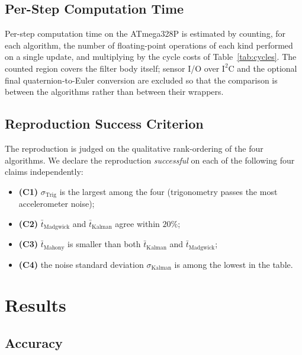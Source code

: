 \documentclass[conference]{IEEEtran}
\begin{document}
\subsection{Per-Step Computation Time}

Per-step computation time on the ATmega328P is estimated by
counting, for each algorithm, the number of floating-point
operations of each kind performed on a single update, and
multiplying by the cycle costs of Table~\ref{tab:cycles}. The
counted region covers the filter body itself; sensor I/O over
$\mathrm{I}^2\mathrm{C}$ and the optional final
quaternion-to-Euler conversion are excluded so that the comparison
is between the algorithms rather than between their wrappers.

\subsection{Reproduction Success Criterion}\label{sec:success}

The reproduction is judged on the qualitative rank-ordering of the
four algorithms. We declare the reproduction \emph{successful} on
each of the following four claims independently:
\begin{itemize}
\item \textbf{(C1)} $\sigma_{\mathrm{Trig}}$ is the largest among
the four (trigonometry passes the most accelerometer noise);
\item \textbf{(C2)} $\bar{t}_{\mathrm{Madgwick}}$ and
$\bar{t}_{\mathrm{Kalman}}$ agree within $20\%$;
\item \textbf{(C3)} $\bar{t}_{\mathrm{Mahony}}$ is smaller than
both $\bar{t}_{\mathrm{Kalman}}$ and $\bar{t}_{\mathrm{Madgwick}}$;
\item \textbf{(C4)} the noise standard deviation
$\sigma_{\mathrm{Kalman}}$ is among the lowest in the table.
\end{itemize}

\section{Results}\label{sec:results}

\subsection{Accuracy}
\end{document}
